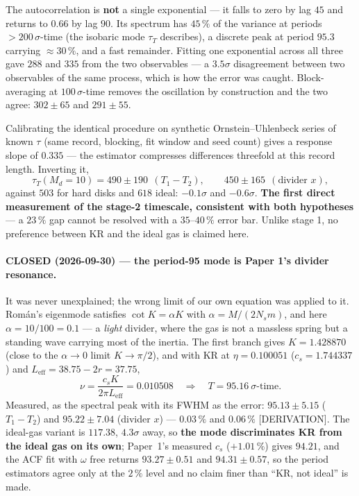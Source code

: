 \documentclass[11pt,a4paper]{article}
\begin{document}
The autocorrelation is \textbf{not} a single exponential --- it falls to zero by lag $45$ and
returns to $0.66$ by lag $90$. Its spectrum has $45\,\%$ of the variance at periods
$> 200\,\sigma$-time (the isobaric mode $\tau_T$ describes), a discrete peak at period
$\mathbf{95.3}$ carrying $\approx 30\,\%$, and a fast remainder. Fitting one exponential across all
three gave $288$ and $335$ from the two observables --- a $3.5\sigma$ disagreement between two
observables of the same process, which is how the error was caught. Block-averaging at
$100\,\sigma$-time removes the oscillation by construction and the two agree:
$302 \pm 65$ and $291 \pm 55$.

Calibrating the identical procedure on synthetic Ornstein--Uhlenbeck series of known $\tau$ (same
record, blocking, fit window and seed count) gives a response slope of $0.335$ --- the estimator
compresses differences threefold at this record length. Inverting it,
\begin{equation}
\tau_T(M_d = 10) = 490 \pm 190 \ \ (T_1-T_2), \qquad 450 \pm 165 \ \ (\text{divider }x),
\end{equation}
against $503$ for hard disks and $618$ ideal: $-0.1\sigma$ and $-0.6\sigma$. \textbf{The first
direct measurement of the stage-2 timescale, consistent with both hypotheses} --- a $23\,\%$ gap
cannot be resolved with a $35$--$40\,\%$ error bar. Unlike stage 1, no preference between KR and the
ideal gas is claimed here.

\paragraph{CLOSED (2026-09-30) --- the period-95 mode is Paper 1's divider resonance.} It was never
unexplained; the wrong limit of our own equation was applied to it. Rom\'an's eigenmode satisfies
$\cot K = \alpha K$ with $\alpha = M/(2N_s m)$, and here $\alpha = 10/100 = \mathbf{0.1}$ --- a
\emph{light} divider, where the gas is not a massless spring but a standing wave carrying most of
the inertia. The first branch gives $K = 1.428870$ (close to the $\alpha \to 0$ limit $K \to \pi/2$),
and with KR at $\eta = 0.100051$ ($c_s = 1.744337$) and $L_{\mathrm{eff}} = 38.75 - 2r = 37.75$,
\begin{equation}
\nu = \frac{c_s K}{2\pi L_{\mathrm{eff}}} = 0.010508 \quad\Longrightarrow\quad
T = \mathbf{95.16}\ \sigma\text{-time}.
\end{equation}
Measured, as the spectral peak with its FWHM as the error: $\mathbf{95.13 \pm 5.15}$ ($T_1-T_2$) and
$\mathbf{95.22 \pm 7.04}$ (divider $x$) --- $0.03\,\%$ and $0.06\,\%$ [DERIVATION]. The ideal-gas
variant is $117.38$, $4.3\sigma$ away, so \textbf{the mode discriminates KR from the ideal gas on
its own}; Paper~1's measured $c_s$ ($+1.01\,\%$) gives $94.21$, and the ACF fit with $\omega$ free
returns $93.27 \pm 0.51$ and $94.31 \pm 0.57$, so the period estimators agree only at the $2\,\%$
level and no claim finer than ``KR, not ideal'' is made.
\end{document}
